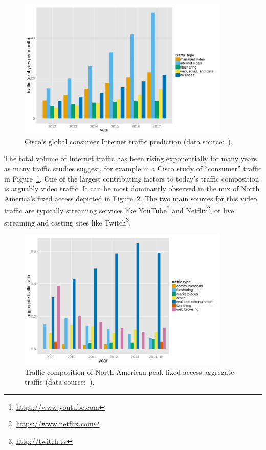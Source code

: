 \begin{figure}[htb]
	\centering
	\includegraphics[width=0.9\textwidth]{images/r-cisco-vni-2013.pdf}
	\caption{Cisco's global consumer Internet traffic prediction (data source:~\cite{cisco2013VNI}).}
\label{c1:fig:traffic-cisco}
\end{figure}

The total volume of Internet traffic has been rising exponentially for many years as many traffic studies suggest, for example in a Cisco study of ``consumer'' traffic in Figure~\ref{c1:fig:traffic-cisco}. One of the largest contributing factors to today's traffic composition is arguably video traffic. It can be most dominantly observed in the mix of North America's fixed access depicted in Figure~\ref{c1:fig:traffic-netvine-fixed}. The two main sources for this video traffic are typically streaming services like YouTube\footnote{\url{https://www.youtube.com}} and Netflix\footnote{\url{https://www.netflix.com}}, or live streaming and casting sites like Twitch\footnote{\url{http://twitch.tv}}. 

\begin{figure}[htb]
	\centering
	\includegraphics[width=0.9\textwidth]{images/r-netvine-phenomena-fixed.pdf}
	\caption{Traffic composition of North American peak fixed access aggregate traffic (data source:~\cite{sandvine_internetphenomena}).}
\label{c1:fig:traffic-netvine-fixed}
\end{figure}

